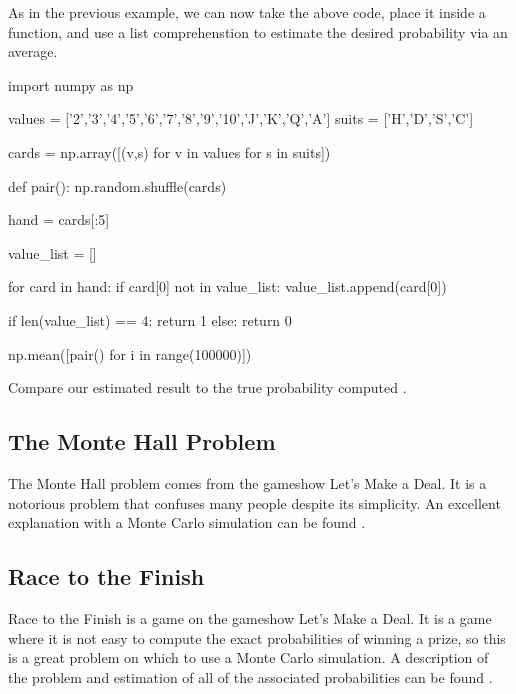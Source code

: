 \documentclass{ximera}
\begin{document}
As in the previous example, we can now take the above code, place it inside a function, and use a list comprehenstion to estimate the desired probability via an average.

\begin{sageCell}
import numpy as np

values = ['2','3','4','5','6','7','8','9','10','J','K','Q','A']
suits = ['H','D','S','C']

cards = np.array([(v,s) for v in values for s in suits])

def pair():
        np.random.shuffle(cards)

        hand = cards[:5]

        value_list = []

        for card in hand:
                if card[0] not in value_list:
                        value_list.append(card[0])

        if len(value_list) == 4:
                return 1
        else:
                return 0

np.mean([pair() for i in range(100000)])
\end{sageCell}

Compare our estimated result to the true probability computed .

\subsection{The Monte Hall Problem}

The Monte Hall problem comes from the gameshow Let's Make a Deal. It is a notorious problem that confuses many people despite its simplicity. An excellent explanation with a Monte Carlo simulation can be found .

\subsection{Race to the Finish}

Race to the Finish is a game on the gameshow Let's Make a Deal. It is a game where it is not easy to compute the exact probabilities of winning a prize, so this is a great problem on which to use a Monte Carlo simulation. A description of the problem and estimation of all of the associated probabilities can be found .
\end{document}
